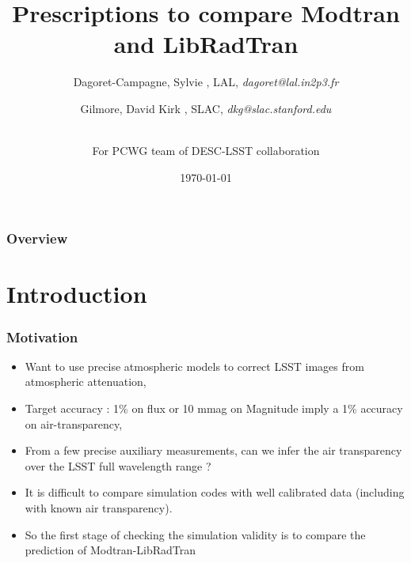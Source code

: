 \documentclass{beamer}
\title[MT-RT Comparison]{Prescriptions to compare Modtran and LibRadTran} %
\author{
Dagoret-Campagne, Sylvie  ,  LAL, %
\textit{dagoret@lal.in2p3.fr} %
\\
\and
Gilmore, David Kirk , SLAC,
\textit{dkg@slac.stanford.edu} %
\and
\\
For PCWG team of DESC-LSST collaboration 
}
\date{\today} %
\begin{document}
\begin{frame}
\titlepage %
\end{frame}

\begin{frame}
\frametitle{Overview} %
\tableofcontents %
\end{frame}



\section{Introduction}

\begin{frame}
\frametitle{Motivation}
\begin{itemize}
\item Want to use precise atmospheric models to correct LSST images from atmospheric attenuation,
\item Target accuracy : 1\% on flux or 10 mmag on Magnitude imply a 1\% accuracy on air-transparency,
\item From a few precise auxiliary measurements, can we infer the air transparency over the LSST full wavelength range ?
\item It is difficult to compare simulation codes with well calibrated data (including with known air  transparency).
\item So the first stage of checking the simulation validity is to compare the prediction of Modtran-LibRadTran
\end{itemize}
\end{frame}
\end{document}
